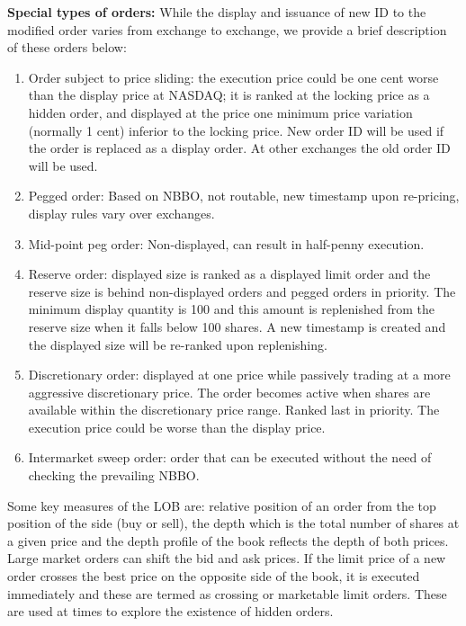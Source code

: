 \noindent\textbf{Special types of orders:} While the display and issuance of new ID to the modified order varies from exchange to exchange, we provide a brief description of these orders below:
\begin{enumerate}[1.]
\item Order subject to price sliding: the execution price could be one cent worse than the display price at NASDAQ; it is ranked at the locking price as a hidden order, and displayed at the price one minimum price variation (normally 1 cent) inferior to the locking price. New order ID will be used if the order is replaced as a display order. At other exchanges the old order ID will be used.

\item Pegged order: Based on NBBO, not routable, new timestamp upon re-pricing, display rules vary over exchanges.

\item Mid-point peg order: Non-displayed, can result in half-penny execution.

\item Reserve order: displayed size is ranked as a displayed limit order and the reserve size is behind non-displayed orders and pegged orders in priority. The minimum display quantity is 100 and this amount is replenished from the reserve size when it falls below 100 shares. A new timestamp is created and the displayed size will be re-ranked upon replenishing.

\item Discretionary order: displayed at one price while passively trading at a more aggressive discretionary price. The order becomes active when shares are available within the discretionary price range. Ranked last in priority. The execution price could be worse than the display price.

\item Intermarket sweep order: order that can be executed without the need of checking the prevailing NBBO.  
\end{enumerate}


Some key measures of the LOB are: relative position of an order from the top position of the side (buy or sell), the depth which is the total number of shares at a given price and the depth profile of the book reflects the depth of both prices. Large market orders can shift the bid and ask prices. If the limit price of a new order crosses the best price on the opposite side of the book, it is executed immediately and these are termed as crossing or marketable limit orders. These are used at times to explore the existence of hidden orders.


